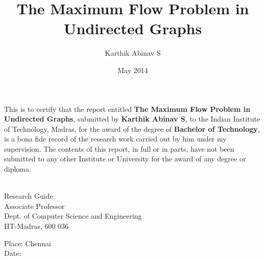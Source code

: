 \documentclass[BTech]{iitmdiss}
\def\thesistitle{The Maximum Flow Problem in Undirected Graphs}
\def\thesisauthor{Karthik Abinav S}
\begin{document}


\title{\thesistitle}

\author{\thesisauthor}

\date{May 2014}

\begin{singlespace}
\maketitle 
\end{singlespace} 


\newtheorem{thm}{Theorem}
\newtheorem{thm2}{Statement}
\newtheorem{lemma}{Lemma}
\newtheorem{prop}{Proposition}
\newtheorem{modif}{Modification}
\newtheorem{defn}{Definition}

\certificate

\vspace*{0.5in}

\noindent This is to certify that the report entitled {\bf {\thesistitle}}, 
submitted by {\bf {\thesisauthor}}, to the Indian Institute of Technology, 
Madras, for the award of the degree of {\bf Bachelor of Technology}, 
is a bona fide record of the research work carried out by him under my
supervision. The contents of this report, in full or in parts, have not been
submitted to any other Institute or University for the award of any degree or
diploma.

\vspace*{1.4in}
\hspace*{-0.25in}
\begin{singlespace}
 \\
\noindent Research Guide \\ 
\noindent Associate Professor \\
\noindent Dept. of Computer Science and Engineering\\
\noindent IIT-Madras, 600 036 \\
\end{singlespace}
\vspace*{0.20in}
\noindent Place: Chennai\\ 
Date:

\acknowledgements
\end{document}
